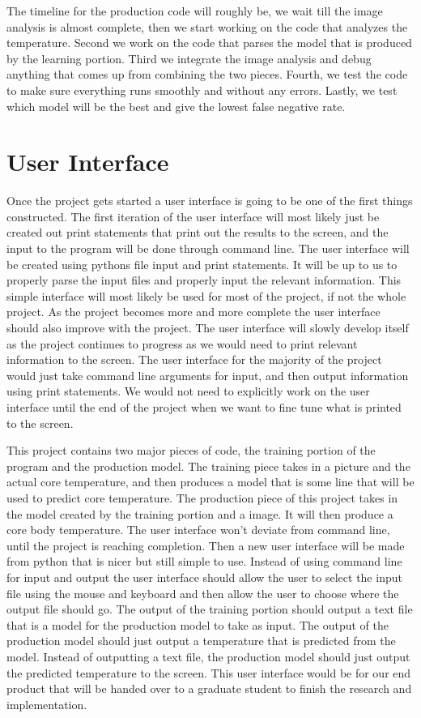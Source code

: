 \documentclass[onecolumn, draftclsnofoot,10pt, compsoc]{IEEEtran}
\begin{document}
The timeline for the production code will roughly be, we wait till the image analysis is almost complete, then we start working on the code that analyzes the temperature. Second we work on the code that parses the model that is produced by the learning portion. Third we integrate the image analysis and debug anything that comes up from combining the two pieces. Fourth, we test the code to make sure everything runs smoothly and without any errors. Lastly, we test which model will be the best and give the lowest false negative rate.

\section{User Interface}
Once the project gets started a user interface is going to be one of the first things constructed. The first iteration of the user interface will most likely just be created out print statements that print out the results to the screen, and the input to the program will be done through command line. The user interface will be created using pythons file input and print statements. It will be up to us to properly parse the input files and properly input the relevant information. This simple interface will most likely be used for most of the project, if not the whole project. As the project becomes more and more complete the user interface should also improve with the project. The user interface will slowly develop itself as the project continues to progress as we would need to print relevant information to the screen. The user interface for the majority of the project would just take command line arguments for input, and then output information using print statements. We would not need to explicitly work on the user interface until the end of the project when we want to fine tune what is printed to the screen.

This project contains two major pieces of code, the training portion of the program and the production model. The training piece takes in a picture and the actual core temperature, and then produces a model that is some line that will be used to predict core temperature. The production piece of this project takes in the model created by the training portion and a image. It will then produce a core body temperature. The user interface won’t deviate from command line, until the project is reaching completion. Then a new user interface will be made from python that is nicer but still simple to use. Instead of using command line for input and output the user interface should allow the user to select the input file using the mouse and keyboard and then allow the user to choose where the output file should go. The output of the training portion should output a text file that is a model for the production model to take as input. The output of the production model should just output a temperature that is predicted from the model. Instead of outputting a text file, the production model should just output the predicted temperature to the screen. This user interface would be for our end product that will be handed over to a graduate student to finish the research and implementation.
\end{document}

